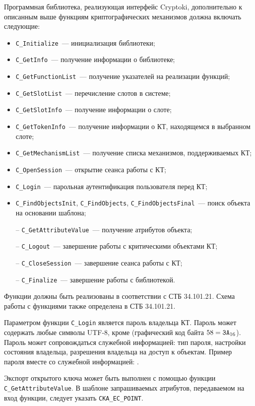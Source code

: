 Программная библиотека, реализующая интерфейс Cryptoki,
дополнительно к описанным выше функциям криптографических механизмов 
должна включать следующие:
\begin{itemize}
\item
\verb|C_Initialize|~--- инициализация библиотеки;
\item
\verb|C_GetInfo|~--- получение информации о библиотеке;
\item
\verb|C_GetFunctionList|~--- получение указателей на реализации функций;
\item
\verb|C_GetSlotList|~--- перечисление слотов в системе;
\item
\verb|C_GetSlotInfo|~--- получение информации о слоте;
\item
\verb|C_GetTokenInfo|~--- получение информации о КТ, находящемся в 
выбранном слоте;
\item
\verb|C_GetMechanismList|~--- 
получение списка механизмов, поддерживаемых КТ;
\item
\verb|C_OpenSession|~--- открытие сеанса работы с КТ;
\item
\verb|C_Login|~--- парольная аутентификация пользователя перед КТ;
\item
\verb|C_FindObjectsInit|, \verb|C_FindObjects|, 
\verb|C_FindObjectsFinal|~---
поиск объекта на основании шаблона;
\item[--]
\verb|C_GetAttributeValue|~--- получение атрибутов объекта;
\item[--]
\verb|C_Logout|~--- завершение работы с критическими объектами КТ;
\item[--]
\verb|C_CloseSession|~--- завершение сеанса работы с КТ;
\item[--]
\verb|C_Finalize|~--- завершение работы с библиотекой.
\end{itemize}

Функции должны быть реализованы в соответствии с СТБ 34.101.21.
Схема работы с функциями также определена в СТБ 34.101.21.

Параметром функции \verb|C_Login| является пароль владельца КТ.
Пароль может содержать любые символы UTF-8, кроме \str{:} 
(графический код байта $58=\texttt{3A}_{16}$). Пароль может сопровождаться 
служебной информацией: тип пароля, настройки состояния владельца,
разрешения владельца на доступ к объектам. 
%
Пример пароля вместе со служебной информацией: . 

Экспорт открытого ключа может быть выполнен с помощью функции 
\verb|C_GetAttributeValue|. В шаблоне запрашиваемых атрибутов, 
передаваемом на вход функции, следует указать \verb|CKA_EC_POINT|.

